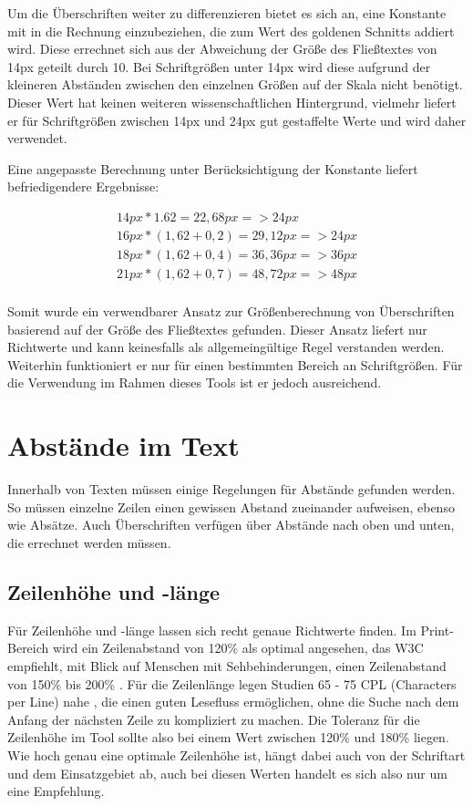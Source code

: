 Um die Überschriften weiter zu differenzieren bietet es sich an, eine Konstante mit in die Rechnung einzubeziehen, die zum Wert des goldenen Schnitts addiert wird. Diese errechnet sich aus der Abweichung der Größe des Fließtextes von 14px geteilt durch 10. Bei Schriftgrößen unter 14px wird diese aufgrund der kleineren Abständen zwischen den einzelnen Größen auf der Skala nicht benötigt.
Dieser Wert hat keinen weiteren wissenschaftlichen Hintergrund, vielmehr liefert er für Schriftgrößen zwischen 14px und 24px gut gestaffelte Werte und wird daher verwendet.

Eine angepasste Berechnung unter Berücksichtigung der Konstante liefert befriedigendere Ergebnisse:

\begin{equation}
\begin{split}
14px * 1.62 = 22,68px => 24px \\
16px * (1,62 + 0,2) = 29,12px => 24px \\
18px * (1,62 + 0,4) = 36,36px => 36px \\
21px * (1,62 + 0,7) = 48,72px => 48px \\
\end{split}
\end{equation}


Somit wurde ein verwendbarer Ansatz zur Größenberechnung von Überschriften basierend auf der Größe des Fließtextes gefunden. Dieser Ansatz liefert nur Richtwerte und kann keinesfalls als allgemeingültige Regel verstanden werden. Weiterhin funktioniert er nur für einen bestimmten Bereich an Schriftgrößen. Für die Verwendung  im Rahmen dieses Tools ist er jedoch ausreichend.



\section{Abstände im Text}
Innerhalb von Texten müssen einige Regelungen für Abstände gefunden werden. So müssen einzelne Zeilen einen gewissen Abstand zueinander aufweisen, ebenso wie Absätze. Auch Überschriften verfügen über Abstände nach oben und unten, die errechnet werden müssen.

\subsection{Zeilenhöhe und -länge}
Für Zeilenhöhe und -länge lassen sich recht genaue Richtwerte finden. Im Print-Bereich wird ein Zeilenabstand von 120\% \cite[S. 150]{Runk200804} als optimal angesehen, das W3C empfiehlt, mit Blick auf Menschen mit Sehbehinderungen, einen Zeilenabstand von 150\% bis 200\% \cite{W3C}. Für die Zeilenlänge legen Studien 65 - 75 CPL (Characters per Line) nahe \cite{bernard2002effects}, die einen guten Lesefluss ermöglichen, ohne die Suche nach dem Anfang der nächsten Zeile zu kompliziert zu machen.
Die Toleranz für die Zeilenhöhe im Tool sollte also bei einem Wert zwischen 120\% und 180\% liegen. Wie hoch genau eine optimale Zeilenhöhe ist, hängt dabei auch von der Schriftart und dem Einsatzgebiet ab, auch bei diesen Werten handelt es sich also nur um eine Empfehlung.

